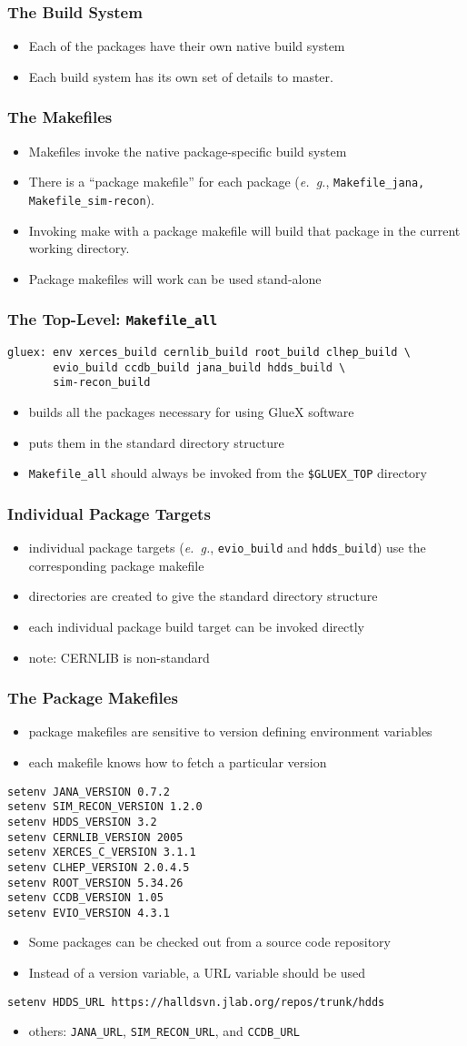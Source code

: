 \documentclass{beamer}
\newcommand{\bi}{\begin{itemize}}
\newcommand{\ei}{\end{itemize}}
\newcommand{\I}{\item}
\begin{document}
\begin{frame}\frametitle{The Build System}
\bi
\I Each of the packages have their own native build system
\I Each build system has its own set of details to master.
\ei
\end{frame}\begin{frame}\frametitle{The Makefiles}
\bi
\I Makefiles invoke the native package-specific build system
\I There is a ``package makefile'' for each package ({\it e.~g.}, {\tt Makefile\_jana, Makefile\_sim-recon}).
\I Invoking make with a package makefile will build that package in the current working directory.
\I Package makefiles will work can be used stand-alone
\ei
\end{frame}
\begin{frame}[fragile]
  \frametitle{The Top-Level: {\tt Makefile\_all}}

\begin{verbatim}
gluex: env xerces_build cernlib_build root_build clhep_build \
       evio_build ccdb_build jana_build hdds_build \
       sim-recon_build
\end{verbatim}
\bi
\I builds all the packages necessary for using GlueX software
\I puts them in the standard directory structure
\I {{\tt Makefile\_all}} should always be invoked from the {\tt \$GLUEX\_TOP} directory
\ei
\end{frame}
\begin{frame}\frametitle{Individual Package Targets}
\bi
\I individual package targets ({\it e.~g.}, {\tt evio\_build}
and {\tt hdds\_build}) use the corresponding package makefile
\I directories are created to give the standard directory structure
\I each individual package build target can be invoked directly
\I note: CERNLIB is non-standard
\ei
\end{frame}\begin{frame}[fragile]
  \frametitle{The Package Makefiles}\label{section:package-makefiles}
\bi
\I package makefiles are sensitive to version defining environment variables
\I each makefile knows how to fetch a particular version
\ei
\begin{verbatim}
setenv JANA_VERSION 0.7.2
setenv SIM_RECON_VERSION 1.2.0
setenv HDDS_VERSION 3.2
setenv CERNLIB_VERSION 2005
setenv XERCES_C_VERSION 3.1.1
setenv CLHEP_VERSION 2.0.4.5
setenv ROOT_VERSION 5.34.26
setenv CCDB_VERSION 1.05
setenv EVIO_VERSION 4.3.1
\end{verbatim}
\bi
\I Some packages can be checked out from a source code repository
\I Instead of a version variable, a URL variable should be used
\ei
\begin{verbatim}
setenv HDDS_URL https://halldsvn.jlab.org/repos/trunk/hdds
\end{verbatim}
\bi
\I others: {\tt JANA\_URL}, {\tt SIM\_RECON\_URL}, and {\tt CCDB\_URL}
\ei
\end{frame}
\end{document}
